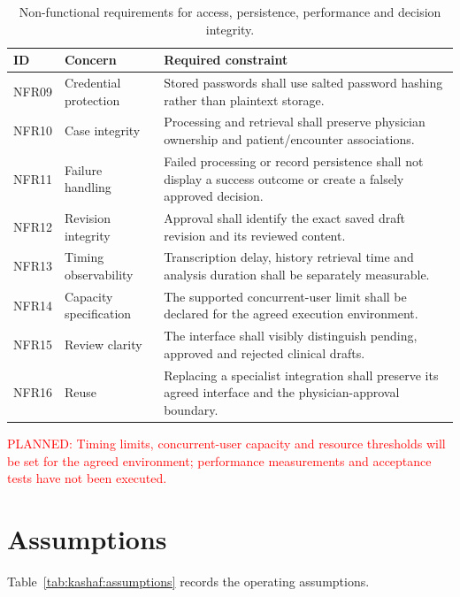 \begin{table}[htbp]
\centering
\small
\caption{Non-functional requirements for access, persistence, performance and decision integrity.}
\label{tab:kashaf:nfr-integrity}
\begin{tabular}{|p{}|p{}|p{}|}
\hline
ID & Concern & Required constraint \\ \hline
NFR09 & Credential protection & Stored passwords shall use salted password hashing rather than plaintext storage. \\ \hline
NFR10 & Case integrity & Processing and retrieval shall preserve physician ownership and patient/encounter associations. \\ \hline
NFR11 & Failure handling & Failed processing or record persistence shall not display a success outcome or create a falsely approved decision. \\ \hline
NFR12 & Revision integrity & Approval shall identify the exact saved draft revision and its reviewed content. \\ \hline
NFR13 & Timing observability & Transcription delay, history retrieval time and analysis duration shall be separately measurable. \\ \hline
NFR14 & Capacity specification & The supported concurrent-user limit shall be declared for the agreed execution environment. \\ \hline
NFR15 & Review clarity & The interface shall visibly distinguish pending, approved and rejected clinical drafts. \\ \hline
NFR16 & Reuse & Replacing a specialist integration shall preserve its agreed interface and the physician-approval boundary. \\ \hline
\end{tabular}
\end{table}

\textcolor{red}{PLANNED: Timing limits, concurrent-user capacity and resource thresholds will be set for the agreed environment; performance measurements and acceptance tests have not been executed.}

\clearpage
\section{Assumptions}
Table~\ref{tab:kashaf:assumptions} records the operating assumptions.

